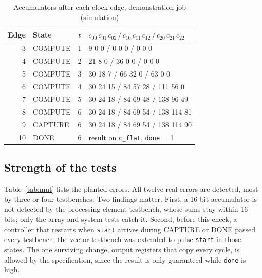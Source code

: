 \documentclass[conference]{IEEEtran}
\newcommand{\code}[1]{\texttt{#1}}
\begin{document}
\begin{table}[t]
\caption{Accumulators after each clock edge, demonstration job (simulation)}
\label{tab:trace}
\centering
\footnotesize
\begin{tabular}{@{}rlcl@{}}
\toprule
Edge & State & $t$ & $c_{00}\, c_{01}\, c_{02}\,/\,c_{10}\, c_{11}\, c_{12}\,/\,c_{20}\, c_{21}\, c_{22}$ \\
\midrule
3 & COMPUTE & 1 & 9 0 0 / 0 0 0 / 0 0 0 \\
4 & COMPUTE & 2 & 21 8 0 / 36 0 0 / 0 0 0 \\
5 & COMPUTE & 3 & 30 18 7 / 66 32 0 / 63 0 0 \\
6 & COMPUTE & 4 & 30 24 15 / 84 57 28 / 111 56 0 \\
7 & COMPUTE & 5 & 30 24 18 / 84 69 48 / 138 96 49 \\
8 & COMPUTE & 6 & 30 24 18 / 84 69 54 / 138 114 81 \\
9 & CAPTURE & 6 & 30 24 18 / 84 69 54 / 138 114 90 \\
10 & DONE & 6 & result on \code{c\_flat}, \code{done} = 1 \\
\bottomrule
\end{tabular}
\end{table}

\subsection{Strength of the tests}
Table~\ref{tab:mut} lists the planted errors. All twelve real errors are detected, most by three or four testbenches. Two findings matter. First, a 16-bit accumulator is not detected by the processing-element testbench, whose sums stay within 16 bits; only the array and system tests catch it. Second, before this check, a controller that restarts when \code{start} arrives during CAPTURE or DONE passed every testbench; the vector testbench was extended to pulse \code{start} in those states. The one surviving change, output registers that copy every cycle, is allowed by the specification, since the result is only guaranteed while \code{done} is high.
\end{document}

